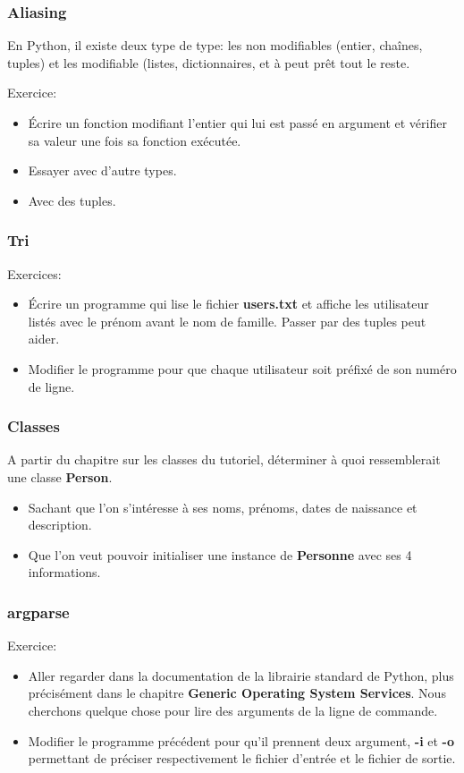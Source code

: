 \documentclass{beamer}
\begin{document}
\begin{frame}\frametitle{Aliasing}
  En Python, il existe deux type de type: les non modifiables (entier, chaînes, tuples) et les modifiable (listes, dictionnaires, et à peut prêt tout le reste.
  
  Exercice: 
  \begin{itemize}
  \item Écrire un fonction modifiant l'entier qui lui est passé en argument et vérifier sa valeur une fois sa fonction exécutée.
  \item Essayer avec d'autre types.
  \item Avec des tuples.
  \end{itemize}
\end{frame}

\begin{frame}\frametitle{Tri}
  Exercices:
  \begin{itemize}
  \item Écrire un programme qui lise le fichier {\bf users.txt} et affiche les utilisateur listés avec le prénom avant le nom de famille. Passer par des tuples peut aider.
  \item Modifier le programme pour que chaque utilisateur soit préfixé de son numéro de ligne.
  \end{itemize}
\end{frame}

\begin{frame}\frametitle{Classes}
  A partir du chapitre sur les classes du tutoriel, déterminer à quoi ressemblerait une classe {\bf Person}. 
  \begin{itemize}
  \item Sachant que l'on s'intéresse à ses noms, prénoms, dates de naissance et description.
  \item Que l'on veut pouvoir initialiser une instance de {\bf Personne} avec ses 4 informations.
  \end{itemize}
\end{frame}

\begin{frame}\frametitle{argparse}
  Exercice:
  \begin{itemize}
  \item Aller regarder dans la documentation de la librairie standard de Python, plus précisément dans le chapitre {\bf Generic Operating System Services}. Nous cherchons quelque chose pour lire des arguments de la ligne de commande.
  \item Modifier le programme précédent pour qu'il prennent deux argument, {\bf -i} et {\bf -o} permettant de préciser respectivement le fichier d'entrée et le fichier de sortie. 
  \end{itemize}
\end{frame}
\end{document}
